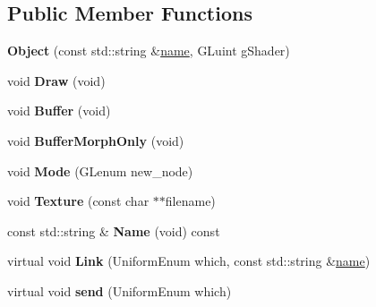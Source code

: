 \subsection*{Public Member Functions}
\begin{DoxyCompactItemize}
\item 
\hypertarget{class_object_aacf42e81415f32f1f2a105ce29c7c1b9}{{\bfseries Object} (const std\-::string \&\hyperlink{class_object_a24457e0a387492c80594aec7681a2277}{name}, G\-Luint g\-Shader)}\label{class_object_aacf42e81415f32f1f2a105ce29c7c1b9}

\item 
\hypertarget{class_object_a3afa1b9af32b78d81b5de0836c511aeb}{void {\bfseries Draw} (void)}\label{class_object_a3afa1b9af32b78d81b5de0836c511aeb}

\item 
\hypertarget{class_object_a35c89a8eb8a5b742a9025331119bfc7c}{void {\bfseries Buffer} (void)}\label{class_object_a35c89a8eb8a5b742a9025331119bfc7c}

\item 
\hypertarget{class_object_a754f9f36a528f050b25d053ed43015f0}{void {\bfseries Buffer\-Morph\-Only} (void)}\label{class_object_a754f9f36a528f050b25d053ed43015f0}

\item 
\hypertarget{class_object_ac6ccf69d21c4c902c62829c48ef6cf5b}{void {\bfseries Mode} (G\-Lenum new\-\_\-node)}\label{class_object_ac6ccf69d21c4c902c62829c48ef6cf5b}

\item 
\hypertarget{class_object_aa104adfbcc2cae4bd68c053cc3dab721}{void {\bfseries Texture} (const char $\ast$$\ast$filename)}\label{class_object_aa104adfbcc2cae4bd68c053cc3dab721}

\item 
\hypertarget{class_object_a890760dff9df547454112ff84510040c}{const std\-::string \& {\bfseries Name} (void) const }\label{class_object_a890760dff9df547454112ff84510040c}

\item 
\hypertarget{class_object_accde5aa6e8d0d582719e94c414c2341c}{virtual void {\bfseries Link} (Uniform\-Enum which, const std\-::string \&\hyperlink{class_object_a24457e0a387492c80594aec7681a2277}{name})}\label{class_object_accde5aa6e8d0d582719e94c414c2341c}

\item 
\hypertarget{class_object_a34258ee199342d785c29d18c49d54e71}{virtual void {\bfseries send} (Uniform\-Enum which)}\label{class_object_a34258ee199342d785c29d18c49d54e71}


\end{DoxyCompactItemize}
